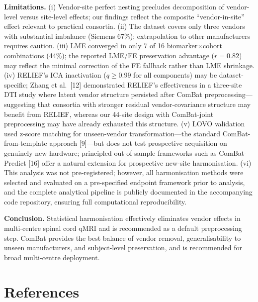 \documentclass[12pt,a4paper]{article}
\begin{document}
\textbf{Limitations.} (i) Vendor-site perfect nesting precludes decomposition of vendor-level versus site-level effects; our findings reflect the composite ``vendor-in-site'' effect relevant to practical consortia. (ii) The dataset covers only three vendors with substantial imbalance (Siemens 67\%); extrapolation to other manufacturers requires caution. (iii) LME converged in only 7 of 16 biomarker$\times$cohort combinations (44\%); the reported LME/FE preservation advantage ($r=0.82$) may reflect the minimal correction of the FE fallback rather than LME shrinkage. (iv) RELIEF's ICA inactivation ($q\geq0.99$ for all components) may be dataset-specific; Zhang et al.\ [12] demonstrated RELIEF's effectiveness in a three-site DTI study where latent vendor structure persisted after ComBat preprocessing---suggesting that consortia with stronger residual vendor-covariance structure may benefit from RELIEF, whereas our 44-site design with ComBat-joint preprocessing may have already exhausted this structure. (v) LOVO validation used z-score matching for unseen-vendor transformation---the standard ComBat-from-template approach [9]---but does not test prospective acquisition on genuinely new hardware; principled out-of-sample frameworks such as ComBat-Predict [16] offer a natural extension for prospective new-site harmonisation. (vi) This analysis was not pre-registered; however, all harmonisation methods were selected and evaluated on a pre-specified endpoint framework prior to analysis, and the complete analytical pipeline is publicly documented in the accompanying code repository, ensuring full computational reproducibility.

\textbf{Conclusion.} Statistical harmonisation effectively eliminates vendor effects in multi-centre spinal cord qMRI and is recommended as a default preprocessing step. ComBat provides the best balance of vendor removal, generalisability to unseen manufacturers, and subject-level preservation, and is recommended for broad multi-centre deployment.

\section*{References}
\end{document}

